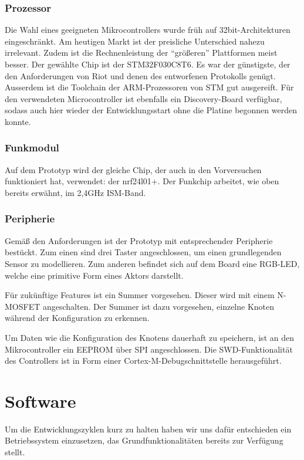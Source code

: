 \documentclass{IEEEtran}
\begin{document}
\subsubsection{Prozessor}
Die Wahl eines geeigneten Mikrocontrollers wurde früh auf 32bit-Architekturen eingeschränkt. Am heutigen Markt ist der preisliche Unterschied nahezu irrelevant. Zudem ist die Rechnenleistung der \enquote{größeren} Plattformen meist besser. Der gewählte Chip ist der STM32F030C8T6. Es war der günstigste, der den Anforderungen von Riot und denen des entworfenen Protokolls genügt. Ausserdem ist die Toolchain der ARM-Prozessoren von STM gut ausgereift.
Für den verwendeten Microcontroller ist ebenfalls ein Discovery-Board verfügbar, sodass auch hier wieder der Entwicklungsstart ohne die Platine begonnen werden konnte.

\subsubsection{Funkmodul}
Auf dem Prototyp wird der gleiche Chip, der auch in den Vorversuchen funktioniert hat, verwendet: der nrf24l01+. Der Funkchip arbeitet, wie oben bereits erwähnt, im 2,4GHz ISM-Band.

\subsubsection{Peripherie}
Gemäß den Anforderungen ist der Prototyp mit entsprechender Peripherie bestückt.
Zum einen sind drei Taster angeschlossen, um einen grundlegenden Sensor zu modellieren.
Zum anderen befindet sich auf dem Board eine RGB-LED, welche eine primitive Form eines Aktors darstellt.

Für zukünftige Features ist ein Summer vorgesehen.
Dieser wird mit einem N-MOSFET angeschalten.
Der Summer ist dazu vorgesehen, einzelne Knoten während der Konfiguration zu erkennen.

Um Daten wie die Konfiguration des Knotens dauerhaft zu speichern, ist an den Mikrocontroller ein EEPROM über SPI angeschlossen.
Die SWD-Funktionalität des Controllers ist in Form einer Cortex-M-Debugschnittstelle herausgeführt.






\section{Software}
    Um die Entwicklungszyklen kurz zu halten haben wir uns dafür entschieden
    ein Betriebssystem einzusetzen, das Grundfunktionalitäten bereits
    zur Verfügung stellt.
\end{document}
